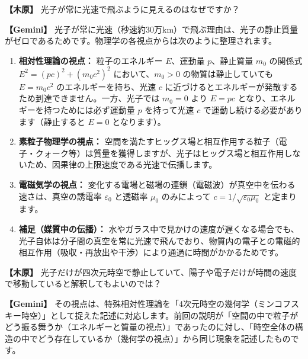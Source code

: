 \documentclass[
  a4paper,
]{ltjsarticle}
\providecommand{\tightlist}{%
  \setlength{\itemsep}{0pt}\setlength{\parskip}{0pt}}
\begin{document}
\textbf{【木原】} 光子が常に光速で飛ぶように見えるのはなぜですか？

\textbf{【Gemini】}
光子が常に光速（秒速約30万km）で飛ぶ理由は、光子の静止質量がゼロであるためです。物理学の各視点からは次のように整理されます。

\begin{enumerate}
\def\labelenumi{\arabic{enumi}.}
\tightlist
\item
  \textbf{相対性理論の視点：} 粒子のエネルギー \(E\)、運動量
  \(p\)、静止質量 \(m_0\) の関係式 \(E^2 = (pc)^2 + (m_0 c^2)^2\)
  において、\(m_0 > 0\) の物質は静止していても \(E = m_0 c^2\)
  のエネルギーを持ち、光速 \(c\)
  に近づけるとエネルギーが発散するため到達できません。一方、光子では
  \(m_0 = 0\) より \(E = pc\) となり、エネルギーを持つためには必ず運動量
  \(p\) を持って光速 \(c\) で運動し続ける必要があります（静止すると
  \(E = 0\) となります）。
\item
  \textbf{素粒子物理学の視点：}
  空間を満たすヒッグス場と相互作用する粒子（電子・クォーク等）は質量を獲得しますが、光子はヒッグス場と相互作用しないため、因果律の上限速度である光速で伝播します。
\item
  \textbf{電磁気学の視点：}
  変化する電場と磁場の連鎖（電磁波）が真空中を伝わる速さは、真空の誘電率
  \(\varepsilon_0\) と透磁率 \(\mu_0\) のみによって
  \(c = 1/\sqrt{\varepsilon_0 \mu_0}\) と定まります。
\item
  \textbf{補足（媒質中の伝播）：}
  水やガラス中で見かけの速度が遅くなる場合でも、光子自体は分子間の真空を常に光速で飛んでおり、物質内の電子との電磁的相互作用（吸収・再放出や干渉）により通過に時間がかかるためです。
\end{enumerate}

\textbf{【木原】}
光子だけが四次元時空で静止していて、陽子や電子だけが時間の速度で移動していると解釈してもよいのでは？

\textbf{【Gemini】}
その視点は、特殊相対性理論を「4次元時空の幾何学（ミンコフスキー時空）」として捉えた記述に対応します。前回の説明が「空間の中で粒子がどう振る舞うか（エネルギーと質量の視点）」であったのに対し、「時空全体の構造の中でどう存在しているか（幾何学の視点）」から同じ現象を記述したものです。
\end{document}
